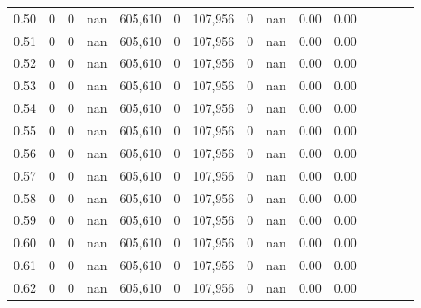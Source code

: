 \begin{tabular}{rrrcrrrrrrrrrrr}
0.50 &        0 &       0 &                                        nan &  605,610 &        0 &  107,956 &        0 &   nan &  0.00 &                         0.00 \\
0.51 &        0 &       0 &                                        nan &  605,610 &        0 &  107,956 &        0 &   nan &  0.00 &                         0.00 \\
0.52 &        0 &       0 &                                        nan &  605,610 &        0 &  107,956 &        0 &   nan &  0.00 &                         0.00 \\
0.53 &        0 &       0 &                                        nan &  605,610 &        0 &  107,956 &        0 &   nan &  0.00 &                         0.00 \\
0.54 &        0 &       0 &                                        nan &  605,610 &        0 &  107,956 &        0 &   nan &  0.00 &                         0.00 \\
0.55 &        0 &       0 &                                        nan &  605,610 &        0 &  107,956 &        0 &   nan &  0.00 &                         0.00 \\
0.56 &        0 &       0 &                                        nan &  605,610 &        0 &  107,956 &        0 &   nan &  0.00 &                         0.00 \\
0.57 &        0 &       0 &                                        nan &  605,610 &        0 &  107,956 &        0 &   nan &  0.00 &                         0.00 \\
0.58 &        0 &       0 &                                        nan &  605,610 &        0 &  107,956 &        0 &   nan &  0.00 &                         0.00 \\
0.59 &        0 &       0 &                                        nan &  605,610 &        0 &  107,956 &        0 &   nan &  0.00 &                         0.00 \\
0.60 &        0 &       0 &                                        nan &  605,610 &        0 &  107,956 &        0 &   nan &  0.00 &                         0.00 \\
0.61 &        0 &       0 &                                        nan &  605,610 &        0 &  107,956 &        0 &   nan &  0.00 &                         0.00 \\
0.62 &        0 &       0 &                                        nan &  605,610 &        0 &  107,956 &        0 &   nan &  0.00 &                         0.00 \\

\end{tabular}
